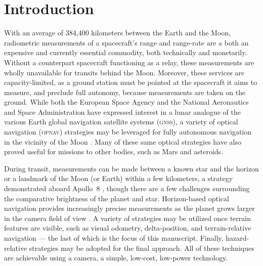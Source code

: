 \documentclass[12pt]{article}
\begin{document}
\maketitle

\section{Introduction}
With an average of 384,400 kilometers between the Earth and the Moon, radiometric measurements of a spacecraft's range and range-rate are a both an expensive and currently essential commodity, both technically and monetarily. Without a counterpart spacecraft functioning as a relay, these measurements are wholly unavailable for transits behind the Moon. Moreover, these services are capacity-limited, as a ground station must be pointed at the spacecraft it aims to measure, and preclude full autonomy, because measurements are taken on the ground. While both the European Space Agency and the National Aeronautics and Space Administration have expressed interest in a lunar analogue of the various Earth global navigation satellite systems (\textsc{gnss}), a variety of optical navigation (\textsc{opnav}) strategies may be leveraged for fully autonomous navigation in the vicinity of the Moon \citep{Christian2009}. Many of these same optical strategies have also proved useful for missions to other bodies, such as Mars and asteroids.

During transit, measurements can be made between a known star and the horizon or a landmark of the Moon (or Earth) within a few kilometers, a strategy demonstrated aboard Apollo~8 \citep{Christian2009,Hoag1976}, though there are a few challenges surrounding the comparative brightness of the planet and star. Horizon-based optical navigation provides increasingly precise measurements as the planet grows larger in the camera field of view \citep{Christian2016,Christian2017}. A variety of strategies may be utilized once terrain features are visible, such as visual odometry, delta-position, and terrain-relative navigation --- the last of which is the focus of this manuscript. Finally, hazard-relative strategies may be adopted for the final approach. All of these techniques are achievable using a camera, a simple, low-cost, low-power technology.

\end{document}
